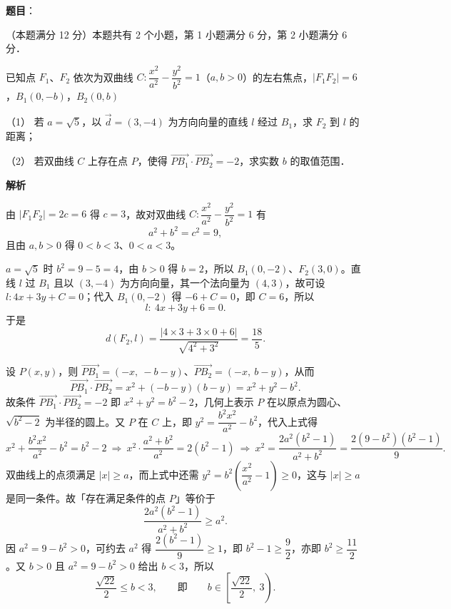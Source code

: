 \begin{answer}

\textbf{题目}：

（本题满分 12 分）本题共有 2 个小题，第 1 小题满分 6 分，第 2 小题满分 6 分．

已知点 \(F_{1}\)、\(F_{2}\) 依次为双曲线 \(C:\dfrac{x^{2}}{a^{2}}-\dfrac{y^{2}}{b^{2}}=1\)（\(a,b>0\)）的左右焦点，\(|F_{1}F_{2}|=6\)，\(B_{1}(0,-b)\)，\(B_{2}(0,b)\)

（1） 若 \(a=\sqrt{5}\)，以 \(\vec{d}=(3,-4)\) 为方向向量的直线 \(l\) 经过 \(B_{1}\)，求 \(F_{2}\) 到 \(l\) 的距离；

（2） 若双曲线 \(C\) 上存在点 \(P\)，使得 \(\overrightarrow{PB_{1}}\cdot\overrightarrow{PB_{2}}=-2\)，求实数 \(b\) 的取值范围．

\textbf{解析}

由 \(|F_{1}F_{2}|=2c=6\) 得 \(c=3\)，故对双曲线 \(C:\dfrac{x^{2}}{a^{2}}-\dfrac{y^{2}}{b^{2}}=1\) 有
\nopagebreak[4]
\[
a^{2}+b^{2}=c^{2}=9,
\]
且由 \(a,b>0\) 得 \(0<b<3\)、\(0<a<3\)。


\(a=\sqrt{5}\) 时 \(b^{2}=9-5=4\)，由 \(b>0\) 得 \(b=2\)，所以 \(B_{1}(0,-2)\)、\(F_{2}(3,0)\)。直线 \(l\) 过 \(B_{1}\) 且以 \((3,-4)\) 为方向向量，其一个法向量为 \((4,3)\)，故可设 \(l:4x+3y+C=0\)；代入 \(B_{1}(0,-2)\) 得 \(-6+C=0\)，即 \(C=6\)，所以
\nopagebreak[4]
\[
l:\ 4x+3y+6=0.
\]
于是
\nopagebreak[4]
\[
d(F_{2},l)=\frac{\left|4\times3+3\times0+6\right|}{\sqrt{4^{2}+3^{2}}}=\frac{18}{5}.
\]


设 \(P(x,y)\)，则 \(\overrightarrow{PB_{1}}=(-x,\ -b-y)\)、\(\overrightarrow{PB_{2}}=(-x,\ b-y)\)，从而
\nopagebreak[4]
\[
\overrightarrow{PB_{1}}\cdot\overrightarrow{PB_{2}}=x^{2}+(-b-y)(b-y)=x^{2}+y^{2}-b^{2}.
\]
故条件 \(\overrightarrow{PB_{1}}\cdot\overrightarrow{PB_{2}}=-2\) 即 \(x^{2}+y^{2}=b^{2}-2\)，几何上表示 \(P\) 在以原点为圆心、\(\sqrt{b^{2}-2}\) 为半径的圆上。又 \(P\) 在 \(C\) 上，即 \(y^{2}=\dfrac{b^{2}x^{2}}{a^{2}}-b^{2}\)，代入上式得
\nopagebreak[4]
\[
x^{2}+\frac{b^{2}x^{2}}{a^{2}}-b^{2}=b^{2}-2\ \Longrightarrow\ x^{2}\cdot\frac{a^{2}+b^{2}}{a^{2}}=2(b^{2}-1)\ \Longrightarrow\ x^{2}=\frac{2a^{2}(b^{2}-1)}{a^{2}+b^{2}}=\frac{2(9-b^{2})(b^{2}-1)}{9}.
\]
双曲线上的点须满足 \(|x|\geqslant a\)，而上式中还需 \(y^{2}=b^{2}\left(\dfrac{x^{2}}{a^{2}}-1\right)\geqslant0\)，这与 \(|x|\geqslant a\) 是同一条件。故「存在满足条件的点 \(P\)」等价于
\nopagebreak[4]
\[
\frac{2a^{2}(b^{2}-1)}{a^{2}+b^{2}}\geqslant a^{2}.
\]
因 \(a^{2}=9-b^{2}>0\)，可约去 \(a^{2}\) 得 \(\dfrac{2(b^{2}-1)}{9}\geqslant1\)，即 \(b^{2}-1\geqslant\dfrac{9}{2}\)，亦即 \(b^{2}\geqslant\dfrac{11}{2}\)。又 \(b>0\) 且 \(a^{2}=9-b^{2}>0\) 给出 \(b<3\)，所以
\nopagebreak[4]
\[
\frac{\sqrt{22}}{2}\leqslant b<3,\qquad\text{即}\qquad b\in\left[\frac{\sqrt{22}}{2},\ 3\right).
\]


\end{answer}
